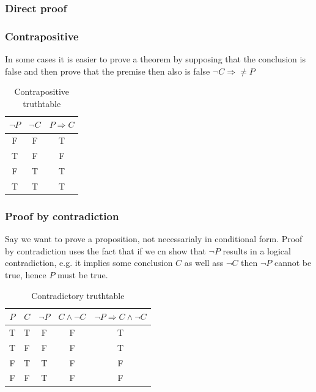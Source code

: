 \documentclass[12pt]{article} %
\begin{document}
\subsubsection{Direct proof}

\subsubsection{Contrapositive}

In some cases it is easier to prove a theorem by supposing that the conclusion is false and then prove that the premise then also is false $\neg C \Rightarrow \neq P$

\begin{table}[h!]
\centering
    \begin{tabular}{ | c | c | c |}
      \hline
      $\neg P$ & $\neg C$ &  $P \Rightarrow C$ \\
      \hline
      F & F & T \\
      T & F & F \\
      F & T & T \\
      T & T & T \\
      \hline
    \end{tabular}
\caption{Contrapositive truthtable}
\label{table: 2}
\end{table}

\subsubsection{Proof by contradiction}

Say we want to prove a proposition, not necessarialy in conditional form. Proof by contradiction uses the fact that if we cn show that $\neg P$ results in a logical contradiction, e.g. it implies some conclusion $C$ as well ass $\neg C$ then $\neg P$ cannot be true, hence $P$ must be true.

\begin{table}[h!]
\centering
    \begin{tabular}{ | c | c | c | c | c |}
      \hline
      $P$ & $C$ &  $\neg P$ & $C \land \neg C$ & $\neg P \Rightarrow C \land \neg C$\\
      \hline
      T & T & F & F & T \\
      T & F & F & F & T\\
      F & T & T & F & F\\
      F & F & T & F & F\\
      \hline
    \end{tabular}
\caption{Contradictory truthtable}
\label{table: 3}
\end{table}
\end{document}

